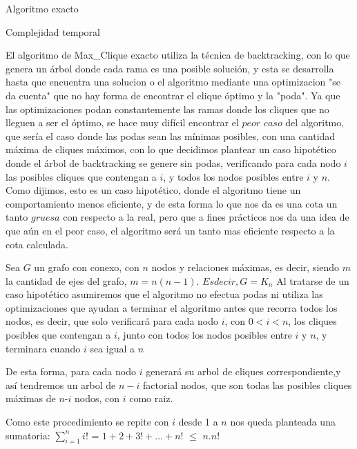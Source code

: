 \begin{section}{Algoritmo exacto}
		\begin{subsection}{Complejidad temporal}


		El algoritmo de Max\_Clique exacto utiliza la técnica de backtracking, con lo que genera un árbol donde cada rama es una posible solución, y esta se desarrolla hasta que encuentra una solucion o el algoritmo mediante una optimizacion "se da cuenta" que no hay forma de encontrar el clique óptimo y la "poda".
		Ya que las optimizaciones podan constantemente las ramas donde los cliques que no lleguen a ser el óptimo, se hace muy difícil encontrar el $peor$ $caso$ del algoritmo, que sería el caso donde las podas sean las mínimas posibles, con una cantidad máxima de cliques máximos, con lo que decidimos plantear un caso hipotético donde el árbol de backtracking se genere sin podas, verifícando para cada nodo $i$ las posibles cliques que contengan a $i$, y todos los nodos posibles entre $i$ y $n$. Como dijimos, esto es un caso hipotético, donde el algoritmo tiene un comportamiento menos eficiente, y de esta forma lo que nos da es una cota un tanto $gruesa$ con respecto a la real, pero que a fines prácticos nos da una idea de que aún en el peor caso, el algoritmo será un tanto mas eficiente respecto a la cota calculada. 

		Sea $G$ un grafo con conexo, con $n$ nodos y relaciones máximas, es decir, siendo $m$ la cantidad de ejes del grafo, $m = n(n-1)$. $Es decir, G = K_n$
		Al tratarse de un caso hipotético asumiremos que el algoritmo no efectua podas ni utiliza las optimizaciones que ayudan a terminar el algoritmo antes que recorra todos los nodos, es decir, que solo verificará para cada nodo $i$, con $0 < i < n$, los cliques posibles que contengan a $i$, junto con todos los nodos posibles entre $i$ y $n$, y terminara cuando $i$ sea igual a $n$

		De esta forma, para cada nodo $i$ generará su arbol de cliques correspondiente,y así tendremos un arbol de $n-i$ factorial nodos, que son todas las posibles cliques máximas de $n$-$i$ nodos, con $i$ como raiz.

		Como este procedimiento se repite con $i$ desde 1 a $n$ nos queda planteada una sumatoria: $\sum_{i=1}^{n}{i!}$ = $1 + 2 + 3! + ... + n!$ $\leq$  $n.n!$
		
		
		
		\end{subsection}
\end{section}

